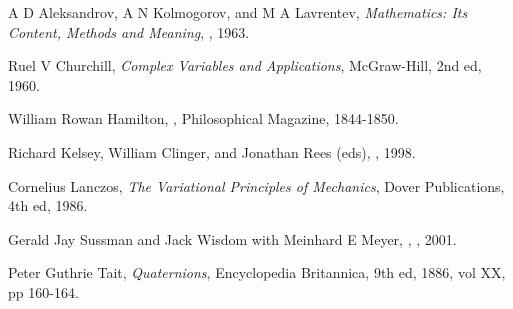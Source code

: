 
 A D Aleksandrov, A N Kolmogorov, and M A Lavrentev,
{\em Mathematics: Its Content, Methods and Meaning},
, 1963.

 Ruel V Churchill, {\em Complex Variables and
Applications}, McGraw-Hill, 2nd ed, 1960.

 William Rowan Hamilton,
, Philosophical Magazine, 1844-1850. 

 Richard Kelsey, William Clinger, and
Jonathan Rees (eds), ,
1998.  

 Cornelius Lanczos, {\em The
Variational Principles of Mechanics},
Dover
Publications, 4th ed, 1986.

 Gerald Jay Sussman and Jack Wisdom with
Meinhard E Meyer,
,
, 2001.

 Peter Guthrie Tait, {\em Quaternions},
Encyclopedia Britannica, 9th ed, 1886, vol XX, pp 160-164. 

\endthebibliography
